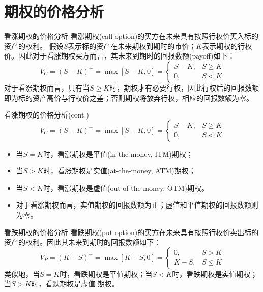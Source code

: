 \documentclass[t]{beamer}
\begin{document}
\section{期权的价格分析}
\begin{frame}{看涨期权的价格分析}
看涨期权(call option)的买方在未来具有按照行权价买入标的资产的权利。
假设$S$表示标的资产在未来期权到期时的市价；$K$表示期权的行权价。因此对于看涨期权买方而言，其未来到期时的回报数额(payoff)如下：
\begin{equation*}
V_C=(S-K)^+=\max[S-K,0]=\begin{cases}
S-K,& S\ge K\\
0,& S<K
\end{cases}
\end{equation*}
对于看涨期权而言，只有当$S\ge K$时，期权才有必要行权，因此行权后的回报数额即为标的资产高价与行权价之差；否则期权将放弃行权，相应的回报数额为零。

\end{frame}

\begin{frame}{看涨期权的价格分析(cont.)}
\begin{equation*}
V_C=(S-K)^+=\max[S-K,0]=\begin{cases}
S-K,& S\ge K\\
0,& S<K
\end{cases}
\end{equation*}
\begin{itemize}
\item 当$S=K$时，看涨期权是平值(in-the-money, ITM)期权；
\item 当$S>K$时，看涨期权是实值(at-the-money, ATM)期权；
\item 当$S<K$时，看涨期权是虚值(out-of-the-money, OTM)期权。
\item 对于看涨期权而言，实值期权的回报数额为正；虚值和平值期权的回报数额则为零。
\end{itemize}

\end{frame}

\begin{frame}{看跌期权的价格分析}
看跌期权(put option)的买方在未来具有按照行权价卖出标的资产的权利。因此其未来到期时的回报数额如下：
\begin{equation*}
V_P=(K-S)^+=\max[K-S,0]=\begin{cases}
0,& S> K\\
K-S,& S\le K
\end{cases}
\end{equation*}
类似地，当$S=K$时，看跌期权是平值期权；当$S<K$时，看跌期权是实值期权；当$S>K$时，看跌期权是虚值
期权。
\end{frame}
\end{document}
